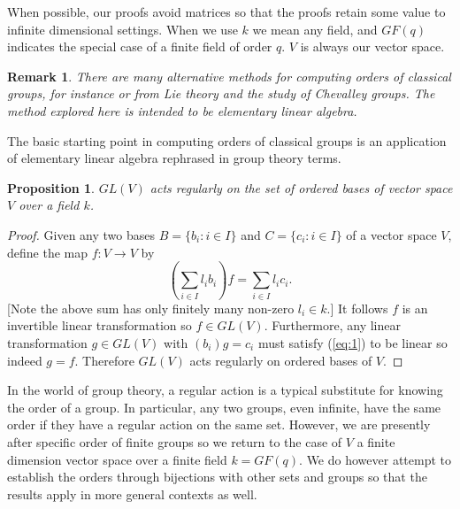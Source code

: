 \documentclass[12pt]{article}
\newtheorem{prop}[thm]{Proposition}
\newtheorem{remark}[thm]{Remark}
\begin{document}
When possible, our proofs avoid matrices so that the proofs retain some value to infinite dimensional settings.  When we use $k$ we mean any field, and $GF(q)$ indicates the special case of a finite field of order $q$.  $V$ is always our vector space.

\begin{remark}
There are many alternative methods for computing orders of classical groups,
for instance  or from Lie theory and
the study of Chevalley groups.  The method explored here is intended to be
elementary linear algebra.
\end{remark}

The basic starting point in computing orders of classical groups is an application of elementary linear algebra rephrased in group theory terms.

\begin{prop}
$GL(V)$ acts regularly on the set of ordered bases of vector space $V$
over a field $k$.
\end{prop}
\begin{proof}
Given any two bases $B=\{b_i:i\in I\}$ and $C=\{c_i:i\in I\}$ of 
a vector space $V$, define the map $f:V\rightarrow V$ by
\begin{equation}\label{eq:1}
\left(\sum_{i\in I} l_i b_i\right)f=\sum_{i\in I}l_i c_i.
\end{equation}
[Note the above sum has only finitely many non-zero $l_i\in k$.]
It follows $f$ is an invertible linear transformation so $f\in GL(V)$.
Furthermore, any linear transformation $g\in GL(V)$ with $(b_i)g=c_i$
must satisfy (\ref{eq:1}) to be linear so indeed $g=f$.  Therefore
$GL(V)$ acts regularly on ordered bases of $V$.
\end{proof}

In the world of group theory, a regular action is a typical substitute for knowing the order of a group.  In particular, any two groups, even infinite, have the same order if they have a regular action on the same set.  However, we are presently after specific order of finite groups so we return to the case of $V$ a finite dimension vector space over a finite field $k=GF(q)$.  We do however attempt to establish the orders through bijections with other sets and groups so that the results apply in more general contexts as well.
\end{document}
